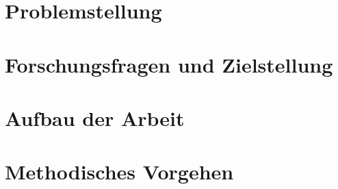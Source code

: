 \section{Problemstellung}

\todots

\section{Forschungsfragen und Zielstellung}


\todots

\section{Aufbau der Arbeit}


\todots

\section{Methodisches Vorgehen}


\todots
